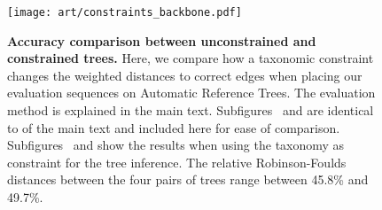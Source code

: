 

\begin{figure}[hpbt]
    \centering
    \texttt{[image: art/constraints\_backbone.pdf]}
    \begin{subfigure}{0pt}
        \label{fig:constraints_backbone:sub:edge_unconstr}
    \end{subfigure}
    \begin{subfigure}{0pt}
        \label{fig:constraints_backbone:sub:edge_constr}
    \end{subfigure}
    \begin{subfigure}{0pt}
        \label{fig:constraints_backbone:sub:branch_unconstr}
    \end{subfigure}
    \begin{subfigure}{0pt}
        \label{fig:constraints_backbone:sub:branch_constr}
    \end{subfigure}
    \caption[Accuracy comparison between unconstrained and constrained trees]{
        \textbf{Accuracy comparison between unconstrained and constrained trees.}
        Here, we compare how a taxonomic constraint changes the weighted distances to correct edges
        when placing our evaluation sequences on Automatic Reference Trees.
        The evaluation method is explained in the main text.
        Subfigures~
        and  are identical to
         of the main text and included here for ease of comparison.
        Subfigures~
        and  show the results when using the
         taxonomy as constraint for the tree inference.
        The relative Robinson-Foulds distances \citep{Robinson1981}
        between the four pairs of trees range between \num{45.8}\% and \num{49.7}\%.
}
\end{figure}
